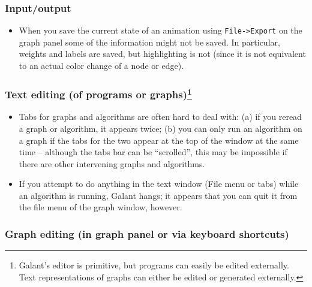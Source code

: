 
\subsubsection*{Input/output}

\begin{itemize}

\item
When you save the current state of an animation using \texttt{File->Export}
on the graph panel some of the information might not be saved.
In particular, weights and labels are saved, but highlighting is not (since it is not equivalent to an actual color change of a node or edge).

\end{itemize}

\subsubsection*{Text editing (of programs or graphs)\footnote{
Galant's editor  is primitive, but
programs can easily be edited externally.
Text representations of graphs can either be edited or generated externally.}}

\begin{itemize}

\item
Tabs for graphs and algorithms are often hard to deal with: (a) if you reread
a graph or algorithm, it appears twice; (b) you can only run an algorithm on a graph if the tabs for the two appear at the top of the window at the same time
-- although the tabs bar can be ``scrolled'',
this may be impossible if there are other intervening graphs and algorithms.

\item If you attempt to do anything in the text window (File menu or tabs)
  while an algorithm is running, Galant hangs; it appears that you can quit it from
the file menu of the graph window, however.

\end{itemize}

\subsubsection*{Graph editing (in graph panel or via keyboard shortcuts)}

